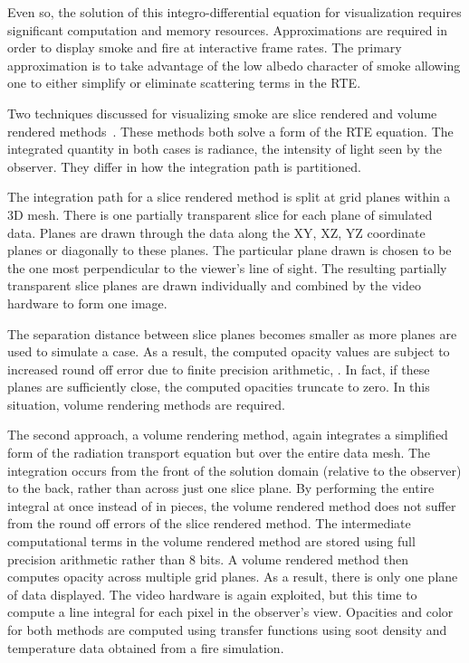 Even so, the solution of this integro-differential equation for visualization requires significant computation and memory  resources.  Approximations are required in order to display smoke and fire at interactive frame rates.  The primary approximation is to take advantage of the low albedo character of smoke allowing one to either simplify or eliminate scattering terms in the RTE.

Two techniques discussed for visualizing smoke are slice rendered and volume rendered methods~\cite{levoy:1988,Engel:2006}.    These methods both solve a form of the RTE equation.  The integrated quantity in both cases is radiance, the intensity of light seen by the observer.  They differ in how the integration path is partitioned.

The integration path for a slice rendered method is split at grid planes within a 3D mesh. There is one partially transparent slice for each plane of simulated data. Planes are drawn through the data along the XY, XZ, YZ coordinate planes or diagonally to these  planes.   The particular plane drawn is chosen to be the one most perpendicular to the viewer's line of sight.  The resulting partially transparent slice planes are drawn individually and combined by the video hardware to form one image.

The separation distance between slice planes becomes smaller as more planes are used to simulate a case.  As a result, the computed opacity values are subject to increased round off error due to finite precision arithmetic, .  In fact, if these planes are sufficiently close, the computed opacities truncate to zero.   In this situation, volume rendering methods are required.

The second approach, a volume rendering method, again integrates a simplified form of the radiation transport equation but over the entire data mesh.  The integration occurs from the front of the solution domain (relative to the observer) to the back, rather than across just one slice plane. By performing the entire integral at once instead of in pieces, the volume rendered method does not suffer from the round off errors of the slice rendered method.  The intermediate computational terms in the volume rendered method are stored using full precision arithmetic rather than 8 bits.  A volume rendered method then computes opacity across multiple grid planes.  As a result, there is only one plane of data displayed.  The video hardware is again exploited, but this time to compute a line integral for each pixel in the observer's view.  Opacities and color for both methods are computed using transfer functions using soot density and temperature data obtained from a fire simulation.

